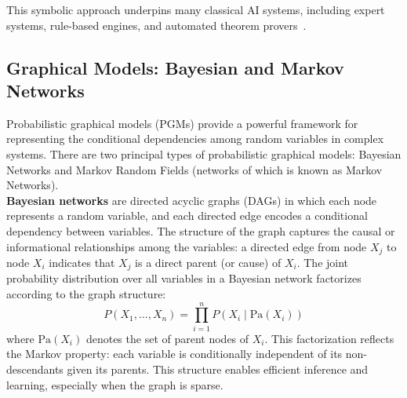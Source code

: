\documentclass[encoding=utf8,british]{tumphthesis}
\begin{document}
            This symbolic approach underpins many classical AI systems, including expert systems, rule-based engines, and automated theorem provers~\cite{symbolicAI}.


        \subsection{Graphical Models: Bayesian and Markov Networks}
        \label{subsect:Foundations_modelling_Bay&Mar}
            Probabilistic graphical models (PGMs) provide a powerful framework for representing the conditional dependencies among random 
            variables in complex systems. There are two principal types of probabilistic graphical models: Bayesian Networks and Markov Random Fields 
            (networks of which is known as Markov Networks).
            \\

            \textbf{Bayesian networks} are directed acyclic graphs (DAGs) in which each node represents a random variable, and each directed 
            edge encodes a conditional dependency between variables. The structure of the graph captures the causal or informational relationships 
            among the variables: a directed edge from node $X_j$ to node $X_i$ indicates that $X_j$ is a direct parent (or cause) of $X_i$.
            The joint probability distribution over all variables in a Bayesian network factorizes according to the graph structure:
            \begin{equation}
                P(X_1, \ldots, X_n) = \prod_{i=1}^n P(X_i \mid \text{Pa}(X_i))
            \end{equation}
            where $\text{Pa}(X_i)$ denotes the set of parent nodes of $X_i$. This factorization reflects the Markov property: each variable is 
            conditionally independent of its non-descendants given its parents. 
            This structure enables efficient inference and learning, especially when the graph is sparse.
            \\
\end{document}
